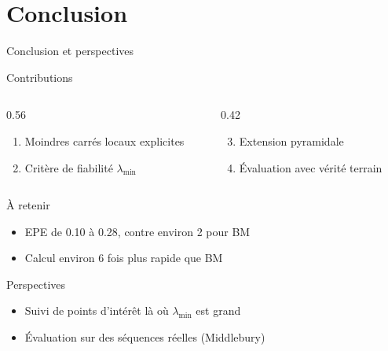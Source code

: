 \documentclass[aspectratio=169, 11pt]{beamer}
\begin{document}
\section{Conclusion}

\begin{frame}{Conclusion et perspectives}
  \begin{block}{Contributions}
    \begin{columns}[T, onlytextwidth]
      \begin{column}{0.56\linewidth}
        \begin{enumerate}
          \item Moindres carrés locaux explicites
          \item Critère de fiabilité $\lambda_{\min}$
        \end{enumerate}
      \end{column}
      \begin{column}{0.42\linewidth}
        \begin{enumerate}
          \setcounter{enumi}{2}
          \item Extension pyramidale
          \item Évaluation avec vérité terrain
        \end{enumerate}
      \end{column}
    \end{columns}
  \end{block}
  \begin{block}{À retenir}
    \begin{itemize}
      \item EPE de \num{0.10} à \qty{0.28}{\pixel}, contre environ
            \qty{2}{\pixel} pour BM
      \item Calcul environ 6 fois plus rapide que BM
    \end{itemize}
  \end{block}
  \begin{exampleblock}{Perspectives}
    \begin{itemize}
      \item Suivi de points d'intérêt là où $\lambda_{\min}$ est grand
      \item Évaluation sur des séquences réelles (Middlebury)
    \end{itemize}
  \end{exampleblock}
\end{frame}
\end{document}
